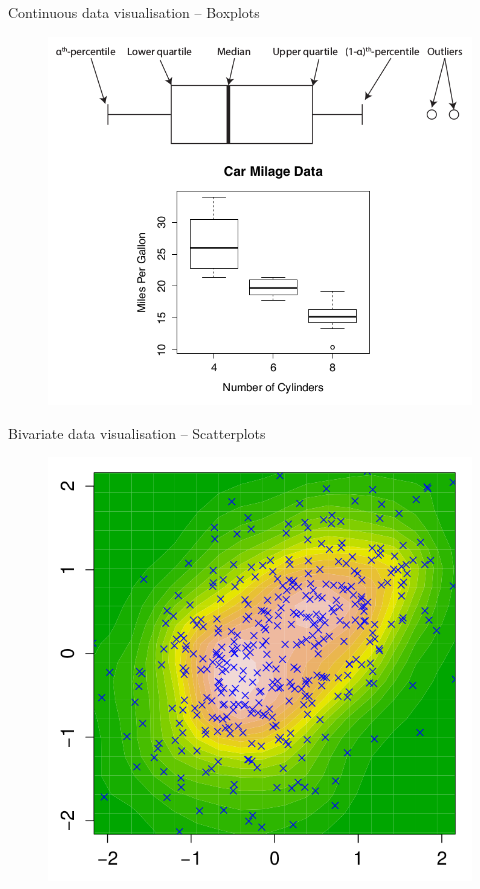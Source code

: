 \documentclass{beamer}
\begin{document}
\begin{frame}{Continuous data visualisation – Boxplots}

        \begin{figure}
                \includegraphics[width=0.7\linewidth]{boxplot.png}
        \end{figure}

\end{frame}

\begin{frame}{Bivariate data visualisation – Scatterplots}

	\begin{figure}
                \includegraphics[width=0.5\linewidth]{scatter.png}
        \end{figure}

\end{frame}
\end{document}
